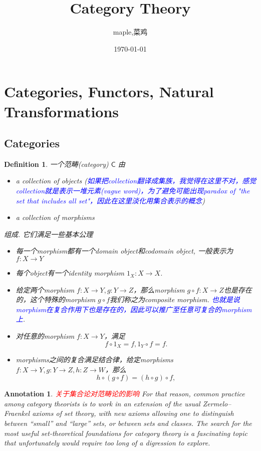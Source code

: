 \documentclass{article}
\title{Category Theory}
\author{maple,菜鸡}
\date{\today}
\newtheorem{definition}[theorem]{Definition}
\newtheorem{annotation}[theorem]{Annotation}
\newcommand*{\cat}[1]{\textsf{#1}\xspace}
\newcommand{\id}{1}
\newcommand*{\xfunc}[4]{{#2}\colon{#3}{#1}{#4}}
\newcommand*{\func}[3]{\xfunc{\to}{#1}{#2}{#3}}
\newcommand*{\idfunc}[1]{\func{\id_{#1}}{#1}{#1}}
\newcommand{\redt}[1]{\textcolor{red}{#1}}
\newcommand{\bluet}[1]{\textcolor{blue}{#1}}
\begin{document}
\maketitle
\tableofcontents


\newpage
\section{Categories, Functors, Natural Transformations}

\subsection{Categories}

\begin{definition}
\rm 一个范畴(category) $\cat{C}$ 由
\begin{itemize}
	\item a collection of objects (\bluet{如果把collection翻译成集族，我觉得在这里不对，感觉collection就是表示一堆元素(vague word)，为了避免可能出现paradox of "the set that includes all set"，因此在这里淡化用集合表示的概念})
	\item a collection of morphisms
\end{itemize}
组成. 它们满足一些基本公理
\begin{itemize}
	\item 每一个morphism都有一个domain object和codomain object, 一般表示为$\func{f}{X}{Y}$
	\item 每个object有一个identity morphism $\idfunc{X}$. 
	\item 给定两个morphism $\func{f}{X}{Y}, \func{g}{Y}{Z}$，那么morphism $\func{g \circ f }{X}{Z}$也是存在的，这个特殊的morphism $g \circ f $我们称之为composite morphism. \bluet{也就是说morphism在复合作用下也是存在的，因此可以推广至任意可复合的morphism上}.
	\item 对任意的morphism $\func{f}{X}{Y}$，满足
	$$
		f\circ\id_X = f, \id_Y \circ f = f. 
	$$
	\item morphisms之间的复合满足结合律，给定morphisms $\func{f}{X}{Y}, \func{g}{Y}{Z}, \func{h}{Z}{W}$，那么
	$$
		h \circ (g \circ f) = (h \circ g) \circ f,
	$$
\end{itemize}
\end{definition}


\begin{annotation}
\rm \redt{关于集合论对范畴论的影响} For that reason, common practice among category theorists is to work in an extension of the usual Zermelo–Fraenkel axioms of set theory, with new axioms allowing one to distinguish between “small” and “large” sets, or between sets and classes. The search for the most useful set-theoretical foundations for category theory is a fascinating topic that unfortunately would require too long of a digression to explore.
\end{annotation}
\end{document}
